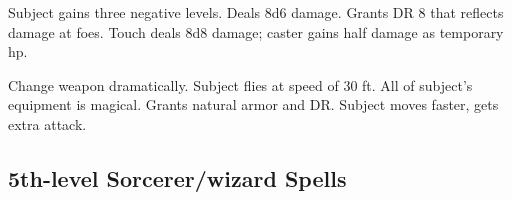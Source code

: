 \begin{swspelllist}
   Subject gains three negative levels.
   Deals 8d6 damage.
   Grants DR 8 that reflects damage at foes.
   Touch deals 8d8 damage; caster gains half damage as temporary hp.

   Change weapon dramatically.
   Subject flies at speed of 30 ft.
   All of subject's equipment is magical.
   Grants natural armor and DR.
   Subject moves faster, gets extra attack.
\end{swspelllist}

\subsection{5th-level Sorcerer/wizard Spells} 
